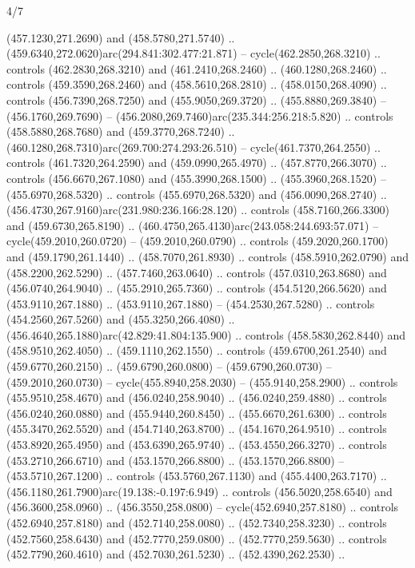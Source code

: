 \begin{flagdescription}{4/7}
\begin{scope}[shift={(0.5\flaglength,0.5\flagwidth)},scale=\flagwidth*\stretchfactor/820]
\begin{scope}[scale=1.87,xshift=-138mm,yshift=75mm]
\begin{scope}[y=0.8pt, x=0.8pt, yscale=-1, xscale=1]
\begin{scope}[fill=c816c2a]
  (457.1230,271.2690) and (458.5780,271.5740) ..
  (459.6340,272.0620)arc(294.841:302.477:21.871) -- cycle(462.2850,268.3210) ..
  controls (462.2830,268.3210) and (461.2410,268.2460) .. (460.1280,268.2460) ..
  controls (459.3590,268.2460) and (458.5610,268.2810) .. (458.0150,268.4090) ..
  controls (456.7390,268.7250) and (455.9050,269.3720) .. (455.8880,269.3840) --
  (456.1760,269.7690) -- (456.2080,269.7460)arc(235.344:256.218:5.820) ..
  controls (458.5880,268.7680) and (459.3770,268.7240) ..
  (460.1280,268.7310)arc(269.700:274.293:26.510) -- cycle(461.7370,264.2550) ..
  controls (461.7320,264.2590) and (459.0990,265.4970) .. (457.8770,266.3070) ..
  controls (456.6670,267.1080) and (455.3990,268.1500) .. (455.3960,268.1520) --
  (455.6970,268.5320) .. controls (455.6970,268.5320) and (456.0090,268.2740) ..
  (456.4730,267.9160)arc(231.980:236.166:28.120) .. controls (458.7160,266.3300)
  and (459.6730,265.8190) .. (460.4750,265.4130)arc(243.058:244.693:57.071) --
  cycle(459.2010,260.0720) -- (459.2010,260.0790) .. controls
  (459.2020,260.1700) and (459.1790,261.1440) .. (458.7070,261.8930) .. controls
  (458.5910,262.0790) and (458.2200,262.5290) .. (457.7460,263.0640) .. controls
  (457.0310,263.8680) and (456.0740,264.9040) .. (455.2910,265.7360) .. controls
  (454.5120,266.5620) and (453.9110,267.1880) .. (453.9110,267.1880) --
  (454.2530,267.5280) .. controls (454.2560,267.5260) and (455.3250,266.4080) ..
  (456.4640,265.1880)arc(42.829:41.804:135.900) .. controls (458.5830,262.8440)
  and (458.9510,262.4050) .. (459.1110,262.1550) .. controls (459.6700,261.2540)
  and (459.6770,260.2150) .. (459.6790,260.0800) -- (459.6790,260.0730) --
  (459.2010,260.0730) -- cycle(455.8940,258.2030) -- (455.9140,258.2900) ..
  controls (455.9510,258.4670) and (456.0240,258.9040) .. (456.0240,259.4880) ..
  controls (456.0240,260.0880) and (455.9440,260.8450) .. (455.6670,261.6300) ..
  controls (455.3470,262.5520) and (454.7140,263.8700) .. (454.1670,264.9510) ..
  controls (453.8920,265.4950) and (453.6390,265.9740) .. (453.4550,266.3270) ..
  controls (453.2710,266.6710) and (453.1570,266.8800) .. (453.1570,266.8800) --
  (453.5710,267.1200) .. controls (453.5760,267.1130) and (455.4400,263.7170) ..
  (456.1180,261.7900)arc(19.138:-0.197:6.949) .. controls (456.5020,258.6540)
  and (456.3600,258.0960) .. (456.3550,258.0800) -- cycle(452.6940,257.8180) ..
  controls (452.6940,257.8180) and (452.7140,258.0080) .. (452.7340,258.3230) ..
  controls (452.7560,258.6430) and (452.7770,259.0800) .. (452.7770,259.5630) ..
  controls (452.7790,260.4610) and (452.7030,261.5230) .. (452.4390,262.2530) ..

\end{scope}
\end{scope}
\end{scope}
\end{scope}
\end{flagdescription}
